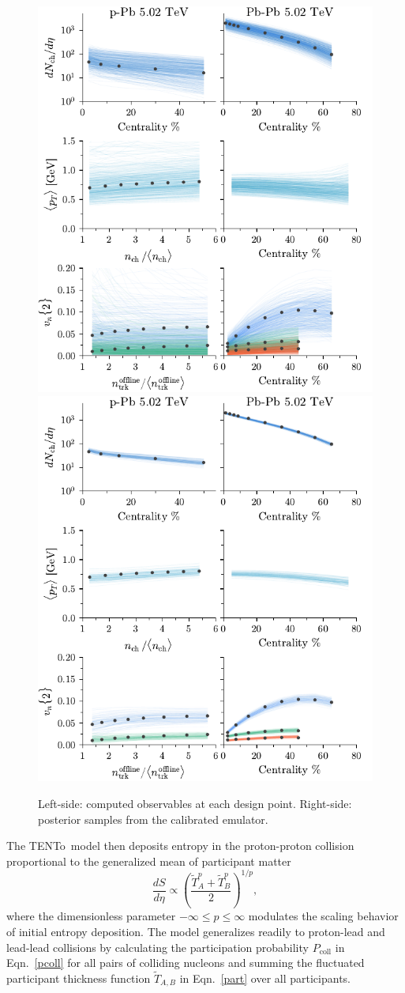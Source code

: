 \documentclass[3p,times,procedia,sort&compress]{elsarticle}
\newcommand{\trento}{T\raisebox{-0.3ex}{R}ENTo}
\newcommand{\T}{\tilde{T}}
\begin{document}
\begin{figure}
  \includegraphics[width=.5\textwidth]{observables_design}
  \includegraphics[width=.5\textwidth]{observables_posterior}
  \caption{\label{fig:calibration} Left-side: computed observables at each design point. Right-side: posterior samples from the calibrated emulator.}
\end{figure}

The \trento\ model then deposits entropy in the proton-proton collision proportional to the generalized mean of participant matter
\begin{equation}
  \label{gmean}
  \frac{dS}{d\eta} \propto \left(\frac{\T_A^p + \T_B^p}{2} \right)^{1/p},
\end{equation}
where the dimensionless parameter ${-\infty \le p \le \infty}$ modulates the scaling behavior of initial entropy deposition.
The model generalizes readily to proton-lead and lead-lead collisions by calculating the participation probability $P_\text{coll}$ in Eqn.~\eqref{pcoll} for all pairs of colliding nucleons and summing the fluctuated participant thickness function $\T_{A,B}$ in Eqn.~\eqref{part} over all participants.
\end{document}
